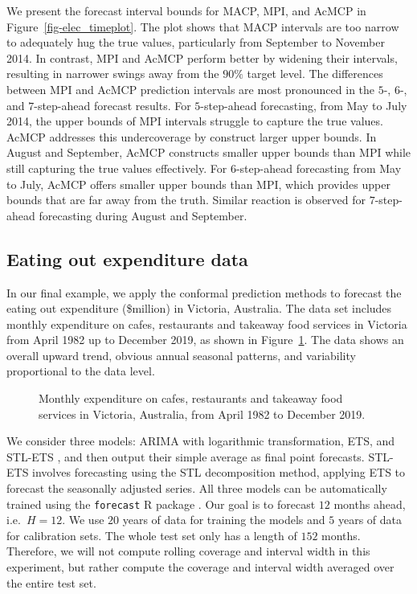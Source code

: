 \documentclass[
  11pt,
  a4paper,
]{article}
\theoremstyle{plain}
\theoremstyle{remark}
\begin{document}
We present the forecast interval bounds for MACP, MPI, and AcMCP in
Figure~\ref{fig-elec_timeplot}. The plot shows that MACP intervals are
too narrow to adequately hug the true values, particularly from
September to November 2014. In contrast, MPI and AcMCP perform better by
widening their intervals, resulting in narrower swings away from the
\(90\%\) target level. The differences between MPI and AcMCP prediction
intervals are most pronounced in the \(5\)-, \(6\)-, and
\(7\)-step-ahead forecast results. For \(5\)-step-ahead forecasting,
from May to July 2014, the upper bounds of MPI intervals struggle to
capture the true values. AcMCP addresses this undercoverage by construct
larger upper bounds. In August and September, AcMCP constructs smaller
upper bounds than MPI while still capturing the true values effectively.
For \(6\)-step-ahead forecasting from May to July, AcMCP offers smaller
upper bounds than MPI, which provides upper bounds that are far away
from the truth. Similar reaction is observed for \(7\)-step-ahead
forecasting during August and September.

\subsection{Eating out expenditure
data}\label{eating-out-expenditure-data}

In our final example, we apply the conformal prediction methods to
forecast the eating out expenditure (\$million) in Victoria, Australia.
The data set includes monthly expenditure on cafes, restaurants and
takeaway food services in Victoria from April 1982 up to December 2019,
as shown in Figure~\ref{fig-cafe_data}. The data shows an overall upward
trend, obvious annual seasonal patterns, and variability proportional to
the data level.

\begin{figure}


\caption{\label{fig-cafe_data}Monthly expenditure on cafes, restaurants
and takeaway food services in Victoria, Australia, from April 1982 to
December 2019.}

\end{figure}%

We consider three models: ARIMA with logarithmic transformation, ETS,
and STL-ETS \autocite{hyndman2021}, and then output their simple average
as final point forecasts. STL-ETS involves forecasting using the STL
decomposition method, applying ETS to forecast the seasonally adjusted
series. All three models can be automatically trained using the
\texttt{forecast} R package \autocite{hyndman2024}. Our goal is to
forecast \(12\) months ahead, i.e.~\(H=12\). We use \(20\) years of data
for training the models and \(5\) years of data for calibration sets.
The whole test set only has a length of \(152\) months. Therefore, we
will not compute rolling coverage and interval width in this experiment,
but rather compute the coverage and interval width averaged over the
entire test set.
\end{document}
